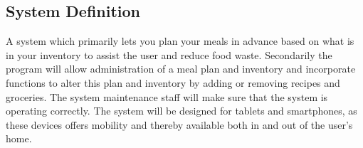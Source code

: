 \subsection{System Definition}
A system which primarily lets you plan your meals in advance based on what is in your inventory to assist the user and reduce food waste.
Secondarily the program will allow administration of a meal plan and inventory and incorporate functions to alter this plan and inventory by adding or removing recipes and groceries. The system maintenance staff will make sure that the system is operating correctly.
The system will be designed for tablets and smartphones, as these devices offers mobility and thereby available both in and out of the user's home.